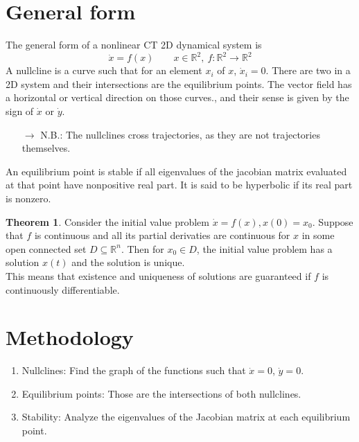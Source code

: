 \documentclass[12pt, openany]{report}
\theoremstyle{definition}
\newtheorem{thm}{Theorem}[chapter]
\newcommand{\R}{\mathbb{R}}
\begin{document}
\section{General form}
The general form of a nonlinear CT 2D dynamical system is 
\begin{equation}
    \dot x = f(x)\qquad x\in \R^2, \: f:\R^2\rightarrow \R^2
\end{equation}
A nullcline is a curve such that for an element \(x_i\) of \(x\), \(\dot x_i=0\). There are two in a 2D system and their intersections are the equilibrium points. The vector field has a horizontal or vertical direction on those curves., and their sense is given by the sign of \(\dot x\) or \(\dot y\).
\begin{itemize}
    \item [\(\rightarrow\)] N.B.: The nullclines cross trajectories, as they are not trajectories themselves. 
\end{itemize}
An equilibrium point is stable if all eigenvalues of the jacobian matrix evaluated at that point have nonpositive real part. It is said to be hyperbolic if its real part is nonzero. 
\begin{thm}
    Consider the initial value problem \(\dot x=f(x),x(0)=x_0\). Suppose that \(f\) is continuous and all its partial derivaties are continuous for \(x\) in some open connected set \(D\subseteq \R^n\). Then for \(x_0\in D\), the initial value problem has a solution \(x(t)\) and the solution is unique. \\
    This means that existence and uniqueness of solutions are guaranteed if \(f\) is continuously differentiable.
\end{thm}
\section{Methodology}
\begin{enumerate}
    \item Nullclines: Find the graph of the functions such that \(\dot x=0\), \(\dot y=0\).
    \item Equilibrium points: Those are the intersections of both nullclines.
    \item Stability: Analyze the eigenvalues of the Jacobian matrix at each equilibrium point.
\end{enumerate}
\end{document}
